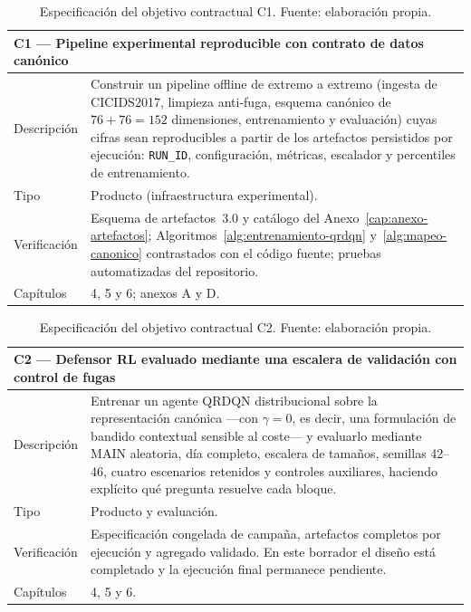 \begin{table}[htbp]
\centering
\small
\begin{tabular}{lp{10.4cm}}
\toprule
\multicolumn{2}{p{12.6cm}}{\textbf{C1 --- Pipeline experimental reproducible con contrato de datos canónico}} \\
\midrule
Descripción & Construir un pipeline offline de extremo a extremo (ingesta de CICIDS2017, limpieza anti-fuga, esquema canónico de $76+76=152$ dimensiones, entrenamiento y evaluación) cuyas cifras sean reproducibles a partir de los artefactos persistidos por ejecución: \texttt{RUN\_ID}, configuración, métricas, escalador y percentiles de entrenamiento. \\
Tipo & Producto (infraestructura experimental). \\
Verificación & Esquema de artefactos~3.0 y catálogo del Anexo~\ref{cap:anexo-artefactos}; Algoritmos~\ref{alg:entrenamiento-qrdqn} y~\ref{alg:mapeo-canonico} contrastados con el código fuente; pruebas automatizadas del repositorio. \\
Capítulos & 4, 5 y 6; anexos A y D. \\
\bottomrule
\end{tabular}
\caption[Objetivo contractual C1]{Especificación del objetivo contractual C1. Fuente: elaboración propia.}
\label{tab:obj-c1}
\end{table}

\begin{table}[htbp]
\centering
\small
\begin{tabular}{lp{10.4cm}}
\toprule
\multicolumn{2}{p{12.6cm}}{\textbf{C2 --- Defensor RL evaluado mediante una escalera de validación con control de fugas}} \\
\midrule
Descripción & Entrenar un agente QRDQN distribucional sobre la representación canónica ---con $\gamma=0$, es decir, una formulación de bandido contextual sensible al coste--- y evaluarlo mediante MAIN aleatoria, día completo, escalera de tamaños, semillas 42--46, cuatro escenarios retenidos y controles auxiliares, haciendo explícito qué pregunta resuelve cada bloque. \\
Tipo & Producto y evaluación. \\
Verificación & Especificación congelada de campaña, artefactos completos por ejecución y agregado validado. En este borrador el diseño está completado y la ejecución final permanece pendiente. \\
Capítulos & 4, 5 y 6. \\
\bottomrule
\end{tabular}
\caption[Objetivo contractual C2]{Especificación del objetivo contractual C2. Fuente: elaboración propia.}
\label{tab:obj-c2}
\end{table}

